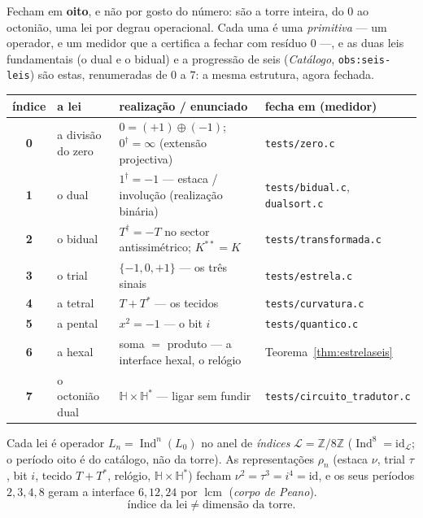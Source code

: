 \documentclass[11pt,a4paper]{article}
\newcommand{\code}[1]{\texttt{\small #1}}
\newcommand{\dg}{^{\dagger}}
\begin{document}
Fecham em \textbf{oito}, e não por gosto do número: são a torre inteira, do $0$ ao octonião, uma lei por
degrau operacional. Cada uma é uma \emph{primitiva} --- um operador, e um medidor que a certifica a fechar
com resíduo $0$ ---, e as duas leis fundamentais (o dual e o bidual) e a progressão de seis (\emph{Catálogo},
\code{obs:seis-leis}) são estas, renumeradas de $0$ a $7$: a mesma estrutura, agora fechada.

\begin{center}\small
\begin{tabular}{@{}clll@{}}
\toprule
índice & a lei & realização / enunciado & fecha em (medidor) \\
\midrule
\textbf{0} & a divisão do zero & $0=(+1)\oplus(-1)$; $0\dg=\infty$ (extensão projectiva) & \code{tests/zero.c} \\
\textbf{1} & o dual & $1\dg=-1$ --- estaca / involução (realização binária) & \code{tests/bidual.c}, \code{dualsort.c} \\
\textbf{2} & o bidual & $T\dg=-T$ no sector antissimétrico; $K^{**}=K$ & \code{tests/transformada.c} \\
\textbf{3} & o trial & $\{-1,0,+1\}$ --- os três sinais & \code{tests/estrela.c} \\
\textbf{4} & a tetral & $T+T^{*}$ --- os tecidos & \code{tests/curvatura.c} \\
\textbf{5} & a pental & $x^2=-1$ --- o bit $i$ & \code{tests/quantico.c} \\
\textbf{6} & a hexal & soma $=$ produto --- a interface hexal, o relógio & Teorema~\ref{thm:estrelaseis} \\
\textbf{7} & o octonião dual & $\mathbb{H}\times\mathbb{H}^{*}$ --- ligar sem fundir & \code{tests/circuito\_tradutor.c} \\
\bottomrule
\end{tabular}
\end{center}

\noindent Cada lei é operador $L_n=\operatorname{Ind}^{n}(L_0)$ no anel de
\emph{índices} $\mathcal L=\mathbb{Z}/8\mathbb{Z}$
(\(\operatorname{Ind}^{8}=\mathrm{id}_{\mathcal L}\); o período oito é do
catálogo, não da torre). As representações $\rho_n$ (estaca $\nu$, trial $\tau$,
bit $i$, tecido $T{+}T^{*}$, relógio, $\mathbb{H}{\times}\mathbb{H}^{*}$)
fecham $\nu^{2}=\tau^{3}=i^{4}=\mathrm{id}$, e os seus períodos $2,3,4,8$
geram a interface $6,12,24$ por $\operatorname{lcm}$
(\emph{corpo de Peano}).
\[
\boxed{\text{índice da lei}\neq\text{dimensão da torre}.}
\]
\end{document}
